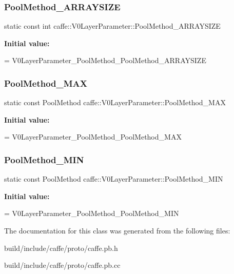 \subsubsection{\texorpdfstring{Pool\+Method\+\_\+\+A\+R\+R\+A\+Y\+S\+I\+ZE}{PoolMethod\_ARRAYSIZE}}
{\footnotesize\ttfamily static const int caffe\+::\+V0\+Layer\+Parameter\+::\+Pool\+Method\+\_\+\+A\+R\+R\+A\+Y\+S\+I\+ZE\hspace{0.3cm}{\ttfamily [static]}}

{\bfseries Initial value\+:}
\begin{DoxyCode}
=
    V0LayerParameter\_PoolMethod\_PoolMethod\_ARRAYSIZE
\end{DoxyCode}
\mbox{\label{classcaffe_1_1_v0_layer_parameter_a39288641170dfa66f55b3b698360674f}} 
\subsubsection{\texorpdfstring{Pool\+Method\+\_\+\+M\+AX}{PoolMethod\_MAX}}
{\footnotesize\ttfamily static const Pool\+Method caffe\+::\+V0\+Layer\+Parameter\+::\+Pool\+Method\+\_\+\+M\+AX\hspace{0.3cm}{\ttfamily [static]}}

{\bfseries Initial value\+:}
\begin{DoxyCode}
=
    V0LayerParameter\_PoolMethod\_PoolMethod\_MAX
\end{DoxyCode}
\mbox{\label{classcaffe_1_1_v0_layer_parameter_a9888cbeee63c2b4b5b0c46a6cd4933b5}} 
\subsubsection{\texorpdfstring{Pool\+Method\+\_\+\+M\+IN}{PoolMethod\_MIN}}
{\footnotesize\ttfamily static const Pool\+Method caffe\+::\+V0\+Layer\+Parameter\+::\+Pool\+Method\+\_\+\+M\+IN\hspace{0.3cm}{\ttfamily [static]}}

{\bfseries Initial value\+:}
\begin{DoxyCode}
=
    V0LayerParameter\_PoolMethod\_PoolMethod\_MIN
\end{DoxyCode}


The documentation for this class was generated from the following files\+:\begin{DoxyCompactItemize}
\item 
build/include/caffe/proto/caffe.\+pb.\+h\item 
build/include/caffe/proto/caffe.\+pb.\+cc\end{DoxyCompactItemize}
